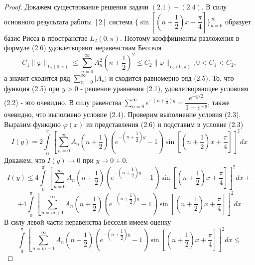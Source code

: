 \documentclass[a4paper, 12pt]{article}
\numberwithin{equation}{section}
\numberwithin{lemma}{section}
\numberwithin{definition}{section}
\numberwithin{notabene}{section}
\numberwithin{corollary}{section}
\begin{document}
\begin{proof}
   
	
	Докажем существование решения задачи $(2.1) - (2.4)$. В силу основного результата работы $[2]$ система $\{\sin{\left[\left(n + \dfrac12\right)x + \dfrac\pi4\right]}\}_{n=0}^{\infty}$ образует базис Рисса в пространстве $L_2(0, \pi)$. Поэтому коэффициенты разложения в формуле (2.6) удовлетворяют неравенствам Бесселя
	\begin{equation*}
		C_1 \|\varphi \|_{L_2(0,\pi)} \leq \sum\limits_{n=0}^{\infty} A_n^2 \left(n + \dfrac12\right)^2 \leq C_2 \|\varphi \|_{L_2(0,\pi)} , 0 < C_1 < C_2, 
	\end{equation*}
а значит сходится ряд $\sum\limits_{n=0}^{\infty} |A_n|$ и сходится равномерно ряд (2.5). То, что функция (2.5) при $y > 0$ - решение уравнения (2.1), удовлетворяющее условиям (2.2) - это очевидно. В силу равенства $\sum\limits_{n=0}^{\infty} e^{-\left(n + \frac12\right)y} = \dfrac{e^{-y/2}}{1 - e^{-y}}$, также очевидно, что выполнено условие (2.4). Проверим выполнение условия (2.3).\newline
Выразим функцию $\varphi(x)$ из представления (2.6) и подставим в условие (2.3)
\begin{equation*}
	I(y) =  2 \int\limits_0^\pi \left[	\sum\limits_{n=0}^{\infty} A_n\left(n+\dfrac12\right) \left( e^{-\left(n+\dfrac12\right)y} - 1\right) \sin{\left[\left(n+\dfrac12\right) x  + \dfrac\pi4\right]} \right]^2 dx
\end{equation*}
Докажем, что $I(y) \to 0$ при $y \to 0+0$. 
\begin{equation*}
	I(y) \leq 4\int\limits_0^\pi \left[	\sum\limits_{n=0}^{m} A_n\left(n+\dfrac12\right) \left( e^{-\left(n+\dfrac12\right)y} - 1\right) \sin{\left[\left(n+\dfrac12\right) x  + \dfrac\pi4\right]} \right]^2 dx + 
\end{equation*}
\begin{equation*}
	+ 4\int\limits_0^\pi \left[	\sum\limits_{n=m+1}^{\infty} A_n\left(n+\dfrac12\right) \left( e^{-\left(n+\dfrac12\right)y} - 1\right) \sin{\left[\left(n+\dfrac12\right) x  + \dfrac\pi4\right]} \right]^2 dx
\end{equation*}
В силу левой части неравенства Бесселя имеем оценку
\begin{equation*}
	\int\limits_0^\pi \left[	\sum\limits_{n=m+1}^{\infty} A_n\left(n+\dfrac12\right) \left( e^{-\left(n+\dfrac12\right)y} - 1\right) \sin{\left[\left(n+\dfrac12\right) x  + \dfrac\pi4\right]} \right]^2 dx \leq 
\end{equation*}
\begin{equation*}

\end{equation*}
\end{proof}
\end{document}
